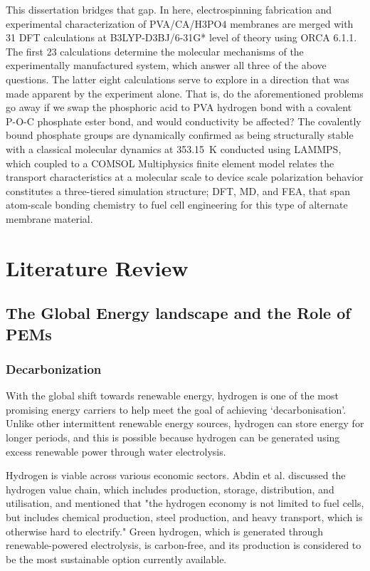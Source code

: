 \documentclass[12pt,a4paper]{report}
\begin{document}
This dissertation bridges that gap. In here, electrospinning fabrication and experimental characterization of PVA/CA/H\(3\)PO\(4\) membranes are merged with 31 DFT calculations at B3LYP-D3BJ/6-31G* level of theory using ORCA 6.1.1.\cite{20,21}
 The first 23 calculations determine the molecular mechanisms of the experimentally manufactured system, which answer all three of the above questions. The latter eight calculations serve to explore in a direction that was made apparent by the experiment alone. That is, do the aforementioned problems go away if we swap the phosphoric acid to PVA hydrogen bond with a covalent P-O-C phosphate ester bond, and would conductivity be affected?
The covalently bound phosphate groups are dynamically confirmed as being structurally stable with a classical molecular dynamics at 353.15~K conducted using LAMMPS, which coupled to a COMSOL Multiphysics finite element model relates the transport characteristics at a molecular scale to device scale polarization behavior constitutes a three-tiered simulation structure; DFT, MD, and FEA, that span atom-scale bonding chemistry to fuel cell engineering for this type of alternate membrane material.\cite{18,19}

\chapter{Literature Review}

\section{The Global Energy landscape and the Role of PEMs}
\subsection{Decarbonization}
With the global shift towards renewable energy, hydrogen is one of the most promising energy carriers to help meet the goal of achieving ‘decarbonisation’. Unlike other intermittent renewable energy sources, hydrogen can store energy for longer periods, and this is possible because hydrogen can be generated using excess renewable power through water electrolysis.\cite{22,23}

Hydrogen is viable across various economic sectors. Abdin et al. discussed the hydrogen value chain, which includes production, storage, distribution, and utilisation, and mentioned that "the hydrogen economy is not limited to fuel cells, but includes chemical production, steel production, and heavy transport, which is otherwise hard to electrify."\cite{22} Green hydrogen, which is generated through renewable-powered electrolysis, is carbon-free, and its production is considered to be the most sustainable option currently available.
\end{document}
